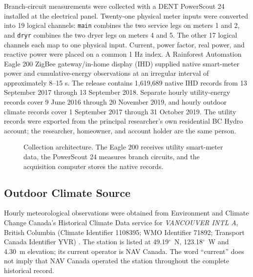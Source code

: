 \documentclass{IEEEoj-data}
\begin{document}
Branch-circuit measurements were collected with a DENT PowerScout 24 installed at the electrical panel. Twenty-one physical meter inputs were converted into 19 logical channels: \texttt{main} combines the two service legs on meters 1 and 2, and \texttt{dryr} combines the two dryer legs on meters 4 and 5. The other 17 logical channels each map to one physical input. Current, power factor, real power, and reactive power were placed on a common 1 Hz index. A Rainforest Automation Eagle 200 ZigBee gateway/in-home display (IHD) supplied native smart-meter power and cumulative-energy observations at an irregular interval of approximately 8--15 s. The release contains 1,619,689 native IHD records from 13 September 2017 through 13 September 2018. Separate hourly utility-energy records cover 9 June 2016 through 20 November 2019, and hourly outdoor climate records cover 1 September 2017 through 31 October 2019. The utility records were exported from the principal researcher's own residential BC Hydro account; the researcher, homeowner, and account holder are the same person.

\begin{figure}[t]
    \centering
    \caption{Collection architecture. The Eagle 200 receives utility smart-meter data, the PowerScout 24 measures branch circuits, and the acquisition computer stores the native records.}
    \label{fig:hardware}
\end{figure}

\subsection{Outdoor Climate Source}
Hourly meteorological observations were obtained from Environment and Climate Change Canada's Historical Climate Data service for \textit{VANCOUVER INTL A}, British Columbia (Climate Identifier 1108395; WMO Identifier 71892; Transport Canada Identifier YVR) \cite{ecccstation}. The station is listed at 49.19$^\circ$~N, 123.18$^\circ$~W and 4.30~m elevation; its current operator is NAV Canada. The word ``current'' does not imply that NAV Canada operated the station throughout the complete historical record.
\end{document}
